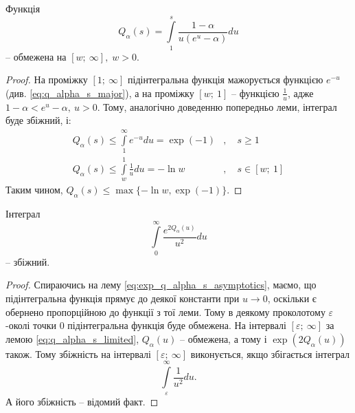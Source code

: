 \begin{lem}
	\label{eq:q_alpha_s_limited}
	Функція
	$$
		Q_\alpha(s) = \int\limits_1^s \frac{1- \alpha}{u(e^u - \alpha)} du
	$$
	  – обмежена на $[w; ~\infty], \; w>0$.
\end{lem}
\begin{proof}
	На проміжку $[1; ~\infty]$ підінтегральна функція мажорується функцією $e^{-u}$ (див. \eqref{eq:q_alpha_s_major}), а на проміжку $[w; ~1]$ – функцією $\frac{1}{u}$, адже $1- \alpha < e^u - \alpha, ~ u > 0$. Тому, аналогічно доведенню попередньо леми, інтеграл буде збіжний, і:
	\begin{align*}
		Q_\alpha(s) \leq \int\limits_1^\infty e^{-u} du = \exp(-1) &,\quad s \geq 1 \\
		Q_\alpha(s) \leq \int\limits_w^1 \frac{1}{u} du = - \ln w &, \quad s \in [w;~1]
	\end{align*}
	Таким чином, $Q_\alpha(s) \leq \max\{-\ln w, \exp(-1)\}$.
\end{proof}

\begin{lem}
	Інтеграл
	$$
		\int\limits_0^\infty \frac{e^{2Q_\alpha(u)}}{u^2} du
	$$
	– збіжний.
\end{lem}
\begin{proof}
	Спираючись на лему \eqref{eq:exp_q_alpha_s_asymptotics}, маємо, що підінтегральна функція прямує до деякої константи при $u \rightarrow 0$, оскільки є обернено пропорційною до функції з тої леми. Тому в деякому проколотому $\varepsilon$-околі точки 0 підінтегральна функція буде обмежена. На інтервалі $[\varepsilon; ~\infty]$ за лемою \eqref{eq:q_alpha_s_limited}, $Q_\alpha(u)$ – обмежена, а тому і $\exp(2Q_\alpha(u))$ також. Тому збіжність на інтервалі $[\varepsilon; ~\infty]$ виконується, якщо збігається інтеграл
	\[
		\int\limits_\varepsilon^\infty \frac{1}{u^2} du.
	\]
	А його збіжність – відомий факт.
\end{proof}
		
